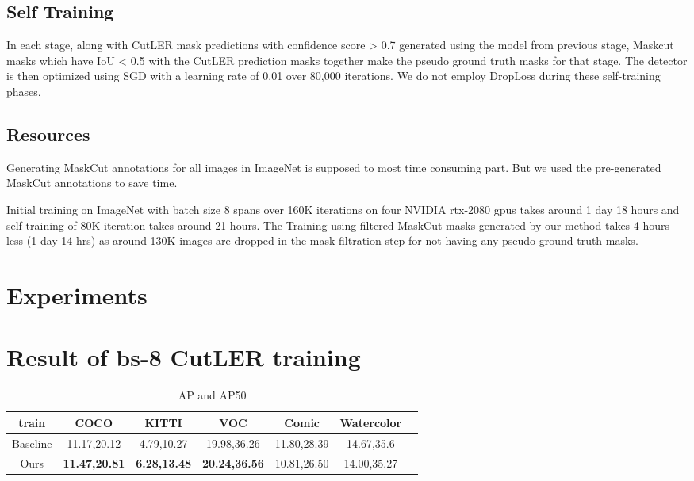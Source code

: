 \subsection{Self Training}
In each stage, along with CutLER mask predictions with confidence score > 0.7 generated using the model from previous stage, Maskcut masks which have IoU < 0.5 with the CutLER prediction masks together make the pseudo ground truth masks for that stage. The detector is then optimized using SGD with a learning rate of 0.01 over 80,000 iterations. We do not employ DropLoss during these self-training phases.

\subsection{Resources}
Generating MaskCut annotations for all images in ImageNet is supposed to most time consuming part. But we used the pre-generated MaskCut annotations to save time.

Initial training on ImageNet with batch size 8 spans over 160K iterations on four NVIDIA rtx-2080 gpus takes around 1 day 18 hours and self-training of 80K iteration takes around 21 hours. The Training using filtered MaskCut masks generated by our method takes 4 hours less (1 day 14 hrs) as around 130K images are dropped in the mask filtration step for not having any pseudo-ground truth masks.


\section{Experiments}



\section{Result of bs-8 CutLER training}
\cite{wang2023cut}
\begin{table}[htbp]
	\centering
	\begin{tabular}{c|c|c|c|c|cl}
		\toprule
		train & COCO & KITTI & VOC & Comic & Watercolor \\ \midrule
		Baseline & 11.17,20.12 & 4.79,10.27 & 19.98,36.26 & 11.80,28.39 & 14.67,35.6 \\ \midrule
		Ours & \textbf{11.47,20.81} & \textbf{6.28,13.48} & \textbf{20.24,36.56} & 10.81,26.50 & 14.00,35.27 \\ \bottomrule
	\end{tabular}
	\caption{AP and AP50}
	\label{tab:base_train}
\end{table}

